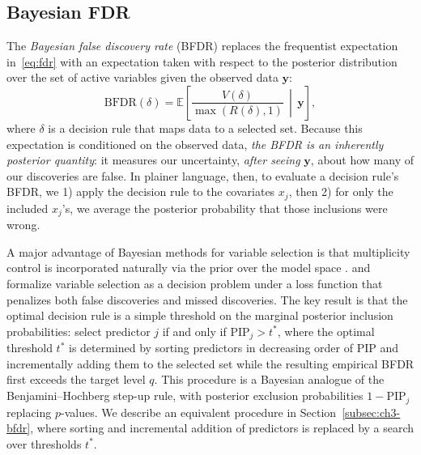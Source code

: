 \subsection{Bayesian FDR}
\label{subsec:bfdr}

The \emph{Bayesian false discovery rate} (BFDR) replaces the
frequentist expectation in~\eqref{eq:fdr} with an expectation
taken with respect to the posterior distribution over the set of
active variables given the observed data $\mathbf{y}$:
\begin{equation}
  \mathrm{BFDR}(\delta)
  = \mathbb{E}\!\left[\frac{V(\delta)}{\max(R(\delta), 1)}
    \,\middle|\, \mathbf{y}\right],
  \label{eq:bfdr}
\end{equation}
where $\delta$ is a decision rule that maps data to a selected set.
Because this expectation is conditioned on the observed data, \emph{the BFDR
is an inherently posterior quantity}: it measures our uncertainty,
\emph{after seeing} $\mathbf{y}$, about how many of our discoveries
are false.  In plainer language, then, to evaluate a decision rule's BFDR, we 1) apply the decision rule to the covariates $x_j$, then 2) for only the included $x_j$'s, we average the posterior probability that those inclusions were wrong.

A major advantage of Bayesian methods for variable selection is
that multiplicity control is incorporated naturally via the prior
over the model space \citep{bernardo_fdr_2007}.  \citet{bernardo_fdr_2007} and \citet{guindani_bayesian_2009} formalize
variable selection as a decision problem under a loss function
that penalizes both false discoveries and missed discoveries.
The key result is that the optimal decision rule is a simple threshold on the marginal posterior
inclusion probabilities: select predictor $j$ if and only if
$\mathrm{PIP}_j > t^*$, where the optimal threshold $t^*$ is
determined by sorting predictors in decreasing order of PIP and
incrementally adding them to the selected set while the resulting
empirical BFDR first exceeds the target level $q$.  This procedure
is a Bayesian analogue of the Benjamini--Hochberg step-up rule,
with posterior exclusion probabilities $1 - \mathrm{PIP}_j$ replacing $p$-values.  We describe an equivalent procedure in Section~\ref{subsec:ch3-bfdr}, where sorting and incremental addition of predictors is replaced by a search over thresholds $t^*$.




